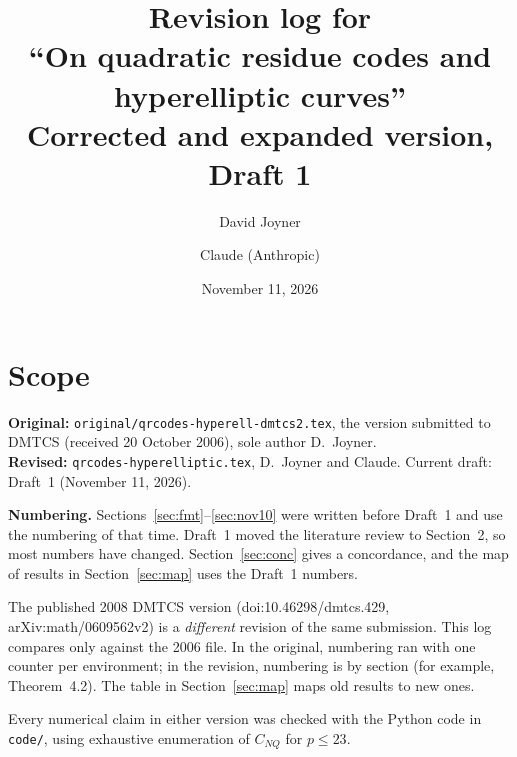 \documentclass[12pt,letterpaper]{article}
\title{Revision log for\\ ``On quadratic residue codes and hyperelliptic curves''\\[4pt]
\large Corrected and expanded version, Draft 1}
\author{David Joyner \and Claude (Anthropic)}
\date{November 11, 2026}
\newcommand{\CNQ}{C_{NQ}}
\begin{document}
\maketitle

\section*{Scope}
\noindent\textbf{Original:} \texttt{original/qrcodes-hyperell-dmtcs2.tex}, the
version submitted to DMTCS (received 20 October 2006), sole author D.~Joyner.\\
\textbf{Revised:} \texttt{qrcodes-hyperelliptic.tex}, D.~Joyner and Claude.
Current draft: Draft~1 (November 11, 2026).

\medskip
\noindent\textbf{Numbering.} Sections~\ref{sec:fmt}--\ref{sec:nov10} were written
before Draft~1 and use the numbering of that time. Draft~1 moved the literature
review to Section~2, so most numbers have changed. Section~\ref{sec:conc} gives a
concordance, and the map of results in Section~\ref{sec:map} uses the Draft~1
numbers.

\medskip
The published 2008 DMTCS version (doi:10.46298/dmtcs.429, arXiv:math/0609562v2) is a
\emph{different} revision of the same submission. This log compares only against
the 2006 file. In the original, numbering ran with one counter per environment; in
the revision, numbering is by section (for example, Theorem~4.2). The table in
Section~\ref{sec:map} maps old results to new ones.

Every numerical claim in either version was checked with the Python code in
\texttt{code/}, using exhaustive enumeration of $\CNQ$ for $p\le23$.
\end{document}
